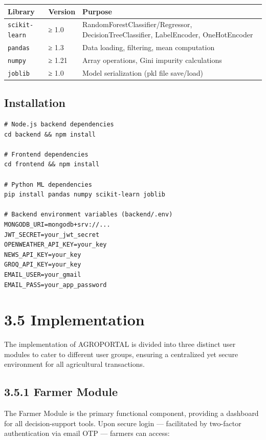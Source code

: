 \documentclass[12pt,a4paper]{report}
\begin{document}
\begin{table}[h!]
\centering
\begin{tabular}{|l|l|l|}
\hline
Library & Version & Purpose \\ \hline
\texttt{scikit-learn} & ≥ 1.0 & RandomForestClassifier/Regressor, DecisionTreeClassifier, LabelEncoder, OneHotEncoder \\ \hline
\texttt{pandas} & ≥ 1.3 & Data loading, filtering, mean computation \\ \hline
\texttt{numpy} & ≥ 1.21 & Array operations, Gini impurity calculations \\ \hline
\texttt{joblib} & ≥ 1.0 & Model serialization (pkl file save/load) \\ \hline
\end{tabular}
\end{table}

\subsection{Installation}

\begin{verbatim}
# Node.js backend dependencies
cd backend && npm install

# Frontend dependencies
cd frontend && npm install

# Python ML dependencies
pip install pandas numpy scikit-learn joblib

# Backend environment variables (backend/.env)
MONGODB_URI=mongodb+srv://...
JWT_SECRET=your_jwt_secret
OPENWEATHER_API_KEY=your_key
NEWS_API_KEY=your_key
GROQ_API_KEY=your_key
EMAIL_USER=your_gmail
EMAIL_PASS=your_app_password
\end{verbatim}

\newpage

\section{3.5 Implementation}

The implementation of AGROPORTAL is divided into three distinct user modules to cater to different user groups, ensuring a centralized yet secure environment for all agricultural transactions.

\subsection{3.5.1 Farmer Module}

The Farmer Module is the primary functional component, providing a dashboard for all decision-support tools. Upon secure login — facilitated by two-factor authentication via email OTP — farmers can access:
\end{document}
